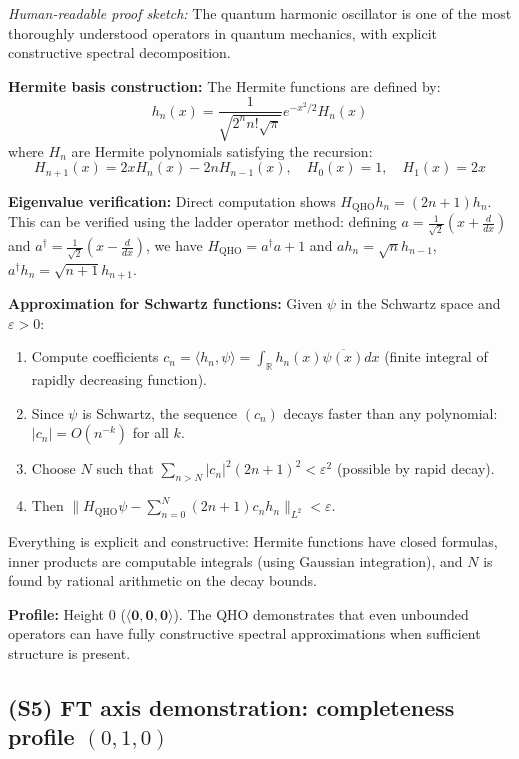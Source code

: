 \documentclass[11pt]{article}
\newcommand{\hzero}{\mathbf{0}}
\newcommand{\allzero}{\langle \hzero,\hzero,\hzero\rangle}
\newcommand{\leanok}{\text{\tiny [✓ Lean]}}
\theoremstyle{plain}
\theoremstyle{definition}
\theoremstyle{remark}
\newenvironment{hrproof}{\noindent\textit{Human-readable proof sketch:} }{}
\newcommand{\R}{\mathbb{R}}
\begin{document}
\begin{hrproof}
The quantum harmonic oscillator is one of the most thoroughly understood operators in quantum mechanics, with explicit constructive spectral decomposition.

\textbf{Hermite basis construction:}
The Hermite functions are defined by:
$$h_n(x) = \frac{1}{\sqrt{2^n n! \sqrt{\pi}}} e^{-x^2/2} H_n(x)$$
where $H_n$ are Hermite polynomials satisfying the recursion:
$$H_{n+1}(x) = 2x H_n(x) - 2n H_{n-1}(x), \quad H_0(x) = 1, \quad H_1(x) = 2x$$

\textbf{Eigenvalue verification:}
Direct computation shows $H_{\mathrm{QHO}} h_n = (2n+1) h_n$. This can be verified using the ladder operator method:
defining $a = \frac{1}{\sqrt{2}}(x + \frac{d}{dx})$ and $a^\dagger = \frac{1}{\sqrt{2}}(x - \frac{d}{dx})$,
we have $H_{\mathrm{QHO}} = a^\dagger a + 1$ and $a h_n = \sqrt{n} h_{n-1}$, $a^\dagger h_n = \sqrt{n+1} h_{n+1}$.

\textbf{Approximation for Schwartz functions:}
Given $\psi$ in the Schwartz space and $\varepsilon > 0$:
\begin{enumerate}
\item Compute coefficients $c_n = \langle h_n, \psi \rangle = \int_\R h_n(x) \overline{\psi(x)} dx$ (finite integral of rapidly decreasing function).
\item Since $\psi$ is Schwartz, the sequence $(c_n)$ decays faster than any polynomial: $|c_n| = O(n^{-k})$ for all $k$.
\item Choose $N$ such that $\sum_{n>N} |c_n|^2(2n+1)^2 < \varepsilon^2$ (possible by rapid decay).
\item Then $\|H_{\mathrm{QHO}}\psi - \sum_{n=0}^N (2n+1) c_n h_n\|_{L^2} < \varepsilon$.
\end{enumerate}

Everything is explicit and constructive: Hermite functions have closed formulas, inner products are computable integrals (using Gaussian integration), and $N$ is found by rational arithmetic on the decay bounds.
\end{hrproof}

\noindent\textbf{Profile:} Height 0 ($\allzero$). The QHO demonstrates that even unbounded operators can have fully constructive spectral approximations when sufficient structure is present.

\subsection{(S5) FT axis demonstration: completeness profile $(0,1,0)$} \leanok
\end{document}
